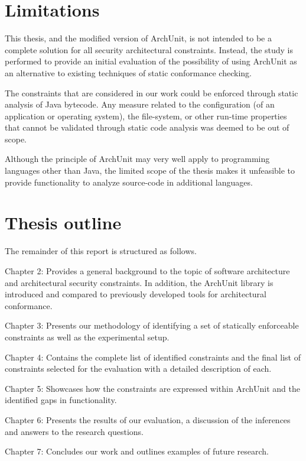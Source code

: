 \section{Limitations}
\label{sec:limitations}

This thesis, and the modified version of ArchUnit, is not intended to be a complete solution for all security architectural constraints. Instead, the study is performed to provide an initial evaluation of the possibility of using ArchUnit as an alternative to existing techniques of static conformance checking. 

The constraints that are considered in our work could be enforced through static analysis of Java bytecode. Any measure related to the configuration (of an application or operating system), the file-system, or other run-time properties that cannot be validated through static code analysis was deemed to be out of scope. 

Although the principle of ArchUnit may very well apply to programming languages other than Java, the limited scope of the thesis makes it unfeasible to provide functionality to analyze source-code in additional languages.

\section{Thesis outline}

The remainder of this report is structured as follows.

Chapter 2: Provides a general background to the topic of software architecture and architectural security constraints. In addition, the ArchUnit library is introduced and compared to previously developed tools for architectural conformance.  

Chapter 3: Presents our methodology of identifying a set of statically enforceable constraints as well as the experimental setup. 

Chapter 4: Contains the complete list of identified constraints and the final list of constraints selected for the evaluation with a detailed description of each. 

Chapter 5: Showcases how the constraints are expressed within ArchUnit and the identified gaps in functionality.

Chapter 6: Presents the results of our evaluation, a discussion of the inferences and answers to the research questions. 

Chapter 7: Concludes our work and outlines examples of future research.